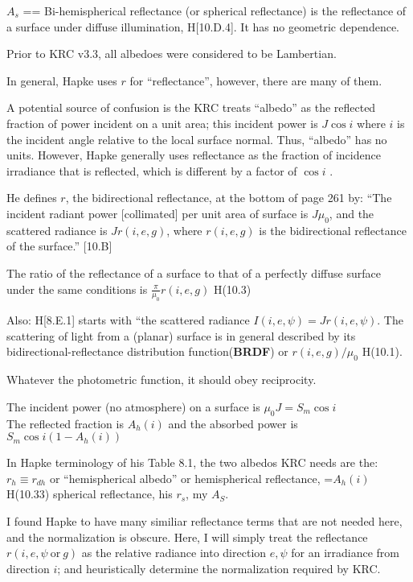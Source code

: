 $A_s$ == Bi-hemispherical reflectance (or spherical reflectance) is the
reflectance of a surface under diffuse illumination, H[10.D.4]. It has no
geometric dependence.

Prior to KRC v3.3, all albedoes were considered to be Lambertian.  

In general, Hapke uses $r$ for ``reflectance'', however, there are many of them.

A potential source of confusion is the KRC treats ``albedo'' as the reflected
fraction of power incident on a unit area; this incident power is $J \cos i$
where $i$ is the incident angle relative to the local surface normal. Thus,
``albedo'' has no units. However, Hapke generally uses reflectance as the
fraction of incidence irradiance that is reflected, which is different by a
factor of $\cos i$ .

He defines $r$, the bidirectional reflectance, at the bottom of page 261 by:
``The incident radiant power [collimated] per unit area of surface is $J \mu_0$,
and the scattered radiance is $Jr(i,e,g)$, where $r(i,e,g)$ is the bidirectional
reflectance of the surface.'' [10.B]

The ratio of the reflectance of a surface to that of a perfectly diffuse surface
under the same conditions is $\frac{\pi}{\mu_0}r(i,e,g)$ H(10.3)

Also: H[8.E.1] starts with ``the scattered radiance $I(i,e,\psi)
=Jr(i,e,\psi)$.
The scattering of light from a (planar) surface is in general described by its
bidirectional-reflectance distribution function(\textbf{BRDF}) or
$r(i,e,g)/\mu_0$ H(10.1).

Whatever the photometric function, it should obey reciprocity.

The incident power (no atmosphere) on a surface is $\mu_0 J = S_m \cos i $
\\ The reflected fraction is $A_h(i)$ and the absorbed power is $S_m \cos i \left(1-A_h(i) \right)$


In Hapke terminology of his Table 8.1, the two albedos KRC needs are the:
\qi  $r_h \equiv r_{dh}$ or ``hemispherical albedo'' or hemispherical reflectance, =$A_h(i)$ H(10.33) 
\qi spherical reflectance, his $r_s$, my $A_S$. 

I found Hapke to have many similiar reflectance terms that are not needed 
here, and the normalization is obscure.  Here, I will simply treat the
reflectance $r(i,e,\psi \ \mathrm{or} \ g)$ as the relative radiance into
direction $e,\psi$ for an irradiance from direction $i$; and heuristically
determine the normalization required by KRC.


